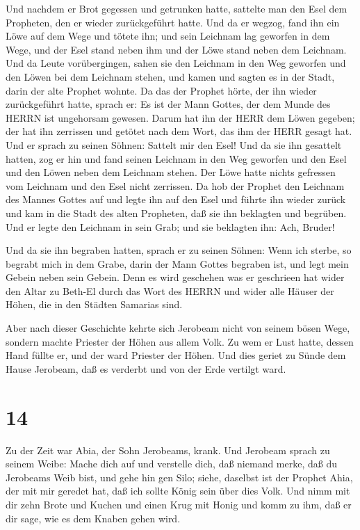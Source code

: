  Und nachdem er Brot gegessen und getrunken hatte, sattelte
man den Esel dem Propheten, den er wieder zurückgeführt hatte.
 Und da er wegzog, fand ihn ein Löwe auf dem Wege und
tötete ihn; und sein Leichnam lag geworfen in dem Wege, und der Esel
stand neben ihm und der Löwe stand neben dem Leichnam.  Und
da Leute vorübergingen, sahen sie den Leichnam in den Weg geworfen und
den Löwen bei dem Leichnam stehen, und kamen und sagten es in der Stadt,
darin der alte Prophet wohnte.  Da das der Prophet hörte,
der ihn wieder zurückgeführt hatte, sprach er: Es ist der Mann Gottes,
der dem Munde des HERRN ist ungehorsam gewesen. Darum hat ihn der HERR
dem Löwen gegeben; der hat ihn zerrissen und getötet nach dem Wort, das
ihm der HERR gesagt hat.  Und er sprach zu seinen Söhnen:
Sattelt mir den Esel! Und da sie ihn gesattelt hatten,  zog
er hin und fand seinen Leichnam in den Weg geworfen und den Esel und den
Löwen neben dem Leichnam stehen. Der Löwe hatte nichts gefressen vom
Leichnam und den Esel nicht zerrissen.  Da hob der Prophet
den Leichnam des Mannes Gottes auf und legte ihn auf den Esel und führte
ihn wieder zurück und kam in die Stadt des alten Propheten, daß sie ihn
beklagten und begrüben.  Und er legte den Leichnam in sein
Grab; und sie beklagten ihn: Ach, Bruder!

 Und da sie ihn begraben hatten, sprach er zu seinen
Söhnen: Wenn ich sterbe, so begrabt mich in dem Grabe, darin der Mann
Gottes begraben ist, und legt mein Gebein neben sein Gebein.
 Denn es wird geschehen was er geschrieen hat wider den
Altar zu Beth-El durch das Wort des HERRN und wider alle Häuser der
Höhen, die in den Städten Samarias sind.

 Aber nach dieser Geschichte kehrte sich Jerobeam nicht von
seinem bösen Wege, sondern machte Priester der Höhen aus allem Volk. Zu
wem er Lust hatte, dessen Hand füllte er, und der ward Priester der
Höhen.  Und dies geriet zu Sünde dem Hause Jerobeam, daß es
verderbt und von der Erde vertilgt ward.

\hypertarget{section-13}{%
\section{14}\label{section-13}}

 Zu der Zeit war Abia, der Sohn Jerobeams, krank.
 Und Jerobeam sprach zu seinem Weibe: Mache dich auf und
verstelle dich, daß niemand merke, daß du Jerobeams Weib bist, und gehe
hin gen Silo; siehe, daselbst ist der Prophet Ahia, der mit mir geredet
hat, daß ich sollte König sein über dies Volk.  Und nimm mit
dir zehn Brote und Kuchen und einen Krug mit Honig und komm zu ihm, daß
er dir sage, wie es dem Knaben gehen wird.

